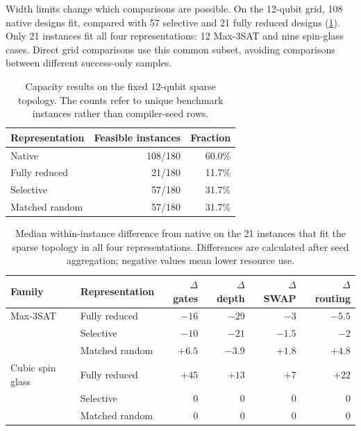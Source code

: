 \documentclass[a4paper,onecolumn,11pt,unpublished]{quantumarticle}
\theoremstyle{remark}
\begin{document}
Width limits change which comparisons are possible. On the 12-qubit grid,
108 native designs fit, compared with 57 selective and 21 fully reduced
designs (\cref{tab:e2-sparse-capacity}). Only 21 instances fit all four
representations: 12 Max-3SAT and nine spin-glass cases. Direct grid
comparisons use this common subset, avoiding comparisons between different
success-only samples.

\begin{table}[!htbp]
    \centering
    \small
    \caption{Capacity results on the fixed 12-qubit sparse topology.  The
    counts refer to unique benchmark instances rather than compiler-seed
    rows.}
    \label{tab:e2-sparse-capacity}
    \begin{tabular}{@{}lrr@{}}
        \toprule
        Representation & Feasible instances & Fraction\\
        \midrule
        Native          & 108/180 & 60.0\%\\
        Fully reduced   & 21/180  & 11.7\%\\
        Selective       & 57/180  & 31.7\%\\
        Matched random  & 57/180  & 31.7\%\\
        \bottomrule
    \end{tabular}
\end{table}

\begin{table}[!htbp]
    \centering
    \small
    \caption{Median within-instance difference from native on the 21 instances
    that fit the sparse topology in all four representations.  Differences are
    calculated after seed aggregation; negative values mean lower resource
    use.}
    \label{tab:e2-sparse-common-paired}
    \begin{tabular}{@{}llrrrr@{}}
        \toprule
        Family & Representation
        & $\Delta$ gates & $\Delta$ depth & $\Delta$ SWAP & $\Delta$ routing\\
        \midrule
        Max-3SAT & Fully reduced  & $-16$ & $-29$ & $-3$   & $-5.5$\\
                 & Selective      & $-10$ & $-21$ & $-1.5$ & $-2$\\
                 & Matched random & $+6.5$ & $-3.9$ & $+1.8$ & $+4.8$\\
        \addlinespace
        Cubic spin glass & Fully reduced  & $+45$ & $+13$ & $+7$ & $+22$\\
                         & Selective      & $0$   & $0$   & $0$  & $0$\\
                         & Matched random & $0$   & $0$   & $0$  & $0$\\
        \bottomrule
    \end{tabular}

\end{table}
\end{document}
